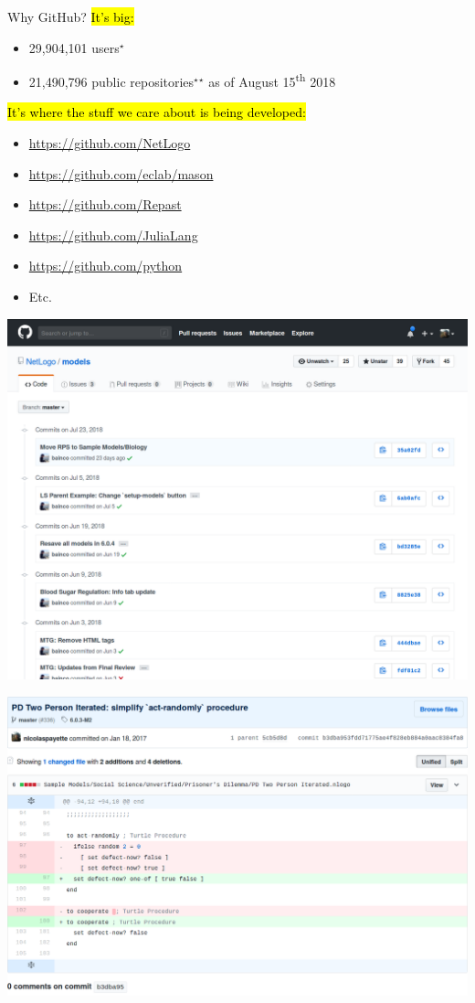 \documentclass{beamer}
\newcommand\st[1]{\hl{\larger #1}\par}
\newcommand\nt[1]{\textcolor{labss_bg}{#1}}
\begin{document}
\begin{frame}{Why GitHub?}\large
  \st{It's big:}
  \begin{itemize}
    \item 29,904,101 users\nt{$^\star$}
    \item 21,490,796 public repositories\nt{$^\star$}\hfill\nt{$^\star$ as of August 15\textsuperscript{th} 2018}
  \end{itemize}
  \vfill\st{It's where the stuff we care about is being developed:}
  \begin{itemize}
    \item \url{https://github.com/NetLogo}
    \item \url{https://github.com/eclab/mason}
    \item \url{https://github.com/Repast}
    \item \url{https://github.com/JuliaLang}
    \item \url{https://github.com/python}
    \item Etc.
  \end{itemize}
\end{frame}

\begin{frame}[plain]
  \includegraphics[width=\textwidth]{commits}
\end{frame}

\begin{frame}[plain]
  \includegraphics[width=\textwidth]{diffs}
\end{frame}
\end{document}
